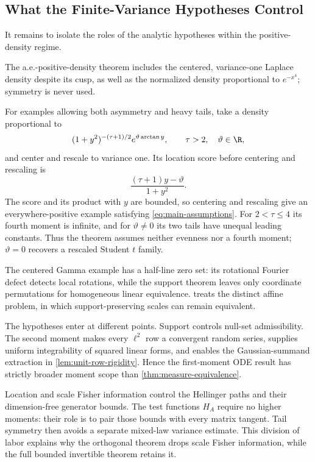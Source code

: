 \subsection{What the Finite-Variance Hypotheses Control}
\label{sec:finite-variance-hypothesis-roles}

It remains to isolate the roles of the analytic hypotheses within the
positive-density regime.

The a.e.-positive-density theorem includes the centered, variance-one Laplace
density despite its cusp, as well as the normalized density proportional to
\(e^{-x^4}\); symmetry is never used.

For examples allowing both asymmetry and heavy tails, take a density
proportional to
\begin{equation}
 (1+y^2)^{-(\tau+1)/2}
                           e^{\vartheta\arctan y},
 \qquad \tau>2,\quad \vartheta\in\R,
 \label{eq:asymmetric-heavy-tail-example}
\end{equation}
and center and rescale to variance one.
Its location score before centering and rescaling is
\[
 \frac{(\tau+1)y-\vartheta}{1+y^2}.
\]
The score and its product with \(y\) are bounded, so centering and rescaling
give an everywhere-positive example satisfying \eqref{eq:main-assumptions}.
For \(2<\tau\le4\) its fourth moment is infinite, and for
\(\vartheta\ne0\) its two tails have unequal leading constants.  Thus the
theorem assumes neither evenness nor a fourth moment; \(\vartheta=0\) recovers
a rescaled Student \(t\) family.

The centered Gamma example has a half-line zero set: its rotational Fourier
defect detects local rotations, while the support theorem leaves only
coordinate permutations for homogeneous linear equivalence.
 treats the distinct affine problem, in
which support-preserving scales can remain equivalent.

The hypotheses enter at different points.  Support controls null-set
admissibility.  The second moment makes every \(\ell^2\) row a convergent random
series, supplies uniform integrability of squared linear forms, and enables the
Gaussian-summand extraction in \cref{lem:unit-row-rigidity}.  Hence the
first-moment ODE result has strictly broader moment scope than
\cref{thm:measure-equivalence}.

Location and scale Fisher information control the Hellinger paths and their
dimension-free generator bounds.  The test functions \(H_A\) require no
higher moments: their role is to pair those bounds with every matrix tangent.
Tail symmetry then avoids a separate mixed-law variance estimate.  This
division of labor explains why the orthogonal theorem drops scale Fisher
information, while the full bounded invertible theorem retains it.
